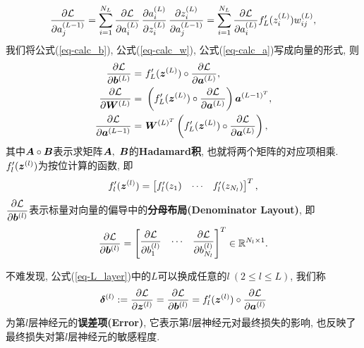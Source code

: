 \documentclass[12pt, a4paper, oneside]{ctexart}
\begin{document}
\begin{equation}\label{eq-calc_a}
    \frac{\partial \mathcal{L}}{\partial a_j^{(L-1)}} = \sum_{i=1}^{N_L}\frac{\partial \mathcal{L}}{\partial a_i^{(L)}}\,\frac{\partial a_i^{(L)}}{\partial z_i^{(L)}}\,\frac{\partial z_i^{(L)}}{\partial a_j^{(L-1)}} = \sum_{i=1}^{N_L}\frac{\partial \mathcal{L}}{\partial a_i^{(L)}}f_L'(z_i^{(L)})w_{ij}^{(L)},
\end{equation}
我们将公式(\ref{eq-calc_b}), 公式(\ref{eq-calc_w}), 公式(\ref{eq-calc_a})写成向量的形式, 则
\begin{equation}\label{eq-L_layer}
    \begin{aligned}
        \frac{\partial \L}{\partial \bd{b}^{(L)}} =&\ f_L'(\bd{z}^{(L)})\circ \frac{\partial \L}{\partial \bd{a}^{(L)}},\\
        \frac{\partial \L}{\partial \bd{W}^{(L)}}=&\ \left(f_L'(\bd{z}^{(L)})\circ \frac{\partial \L}{\partial \bd{a}^{(L)}}\right)\bd{a}^{(L-1)^T},\\
        \frac{\partial \L}{\partial \bd{a}^{(L-1)}}=&\ \bd{W}^{(L)^T}\left(f_L'(\bd{z}^{(L)})\circ \frac{\partial \L}{\partial \bd{a}^{(L)}}\right),
    \end{aligned}
\end{equation}
其中$\boldsymbol{A}\circ\boldsymbol{B}$表示求矩阵$\bd{A},\ \bd{B}$的\textbf{Hadamard积}, 也就将两个矩阵的对应项相乘. $f_l'(\boldsymbol{z}^{(l)})$为按位计算的函数, 即
\begin{equation}
    f_l'(\boldsymbol{z}^{(l)}) = \left[\begin{matrix}
        f_l'(z_1)&\cdots&f_l'(z_{N_l})
    \end{matrix}\right]^T,
\end{equation}
$\displaystyle \frac{\partial \mathcal{L}}{\partial \boldsymbol{b}^{(l)}}$表示标量对向量的偏导中的\textbf{分母布局(Denominator Layout)}, 即
\begin{equation}
\frac{\partial \mathcal{L}}{\partial \boldsymbol{b}^{(l)}} = \left[\begin{matrix}
    \dfrac{\partial \mathcal{L}}{\partial b^{(l)}_1}&\cdots&\dfrac{\partial \mathcal{L}}{\partial b^{(l)}_{N_l}}
\end{matrix}\right]^T\in \mathbb{R}^{N_l\times 1}.
\end{equation}

不难发现, 公式(\ref{eq-L_layer})中的$L$可以换成任意的$l\ (2\leqslant l\leqslant L)$, 我们称
\begin{equation*}
 \displaystyle \boldsymbol{\delta}^{(l)}:=\frac{\partial \mathcal{L}}{\partial \boldsymbol{z}^{(l)}} = \frac{\partial \mathcal{L}}{\partial \boldsymbol{b}^{(l)}} = f_l'(\boldsymbol{z}^{(l)})\circ \frac{\partial \mathcal{L}}{\partial \boldsymbol{a}^{(l)}}   
\end{equation*}
为第$l$层神经元的\textbf{误差项(Error)}, 它表示第$l$层神经元对最终损失的影响, 也反映了最终损失对第$l$层神经元的敏感程度. 
\end{document}
